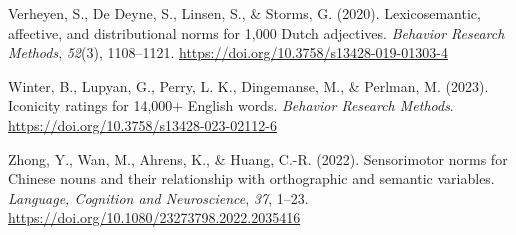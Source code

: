 \documentclass[
  man,floatsintext]{apa6}
\newlength{\cslhangindent}
\newlength{\cslentryspacingunit} %
\newenvironment{CSLReferences}[2] %
 {%
  \setlength{\parindent}{0pt}
  \ifodd #1
  \let\oldpar\par
  \def\par{\hangindent=\cslhangindent\oldpar}
  \fi
  \setlength{\parskip}{#2\cslentryspacingunit}
 }%
 {}
\begin{document}
\begin{CSLReferences}{1}{0}
\leavevmode{}%
Verheyen, S., De Deyne, S., Linsen, S., \& Storms, G. (2020). Lexicosemantic, affective, and distributional norms for 1,000 {Dutch} adjectives. \emph{Behavior Research Methods}, \emph{52}(3), 1108--1121. \url{https://doi.org/10.3758/s13428-019-01303-4}

\leavevmode{}%
Winter, B., Lupyan, G., Perry, L. K., Dingemanse, M., \& Perlman, M. (2023). Iconicity ratings for 14,000+ {English} words. \emph{Behavior Research Methods}. \url{https://doi.org/10.3758/s13428-023-02112-6}

\leavevmode{}%
Zhong, Y., Wan, M., Ahrens, K., \& Huang, C.-R. (2022). Sensorimotor norms for {Chinese} nouns and their relationship with orthographic and semantic variables. \emph{Language, Cognition and Neuroscience}, \emph{37}, 1--23. \url{https://doi.org/10.1080/23273798.2022.2035416}

\end{CSLReferences}
\end{document}
